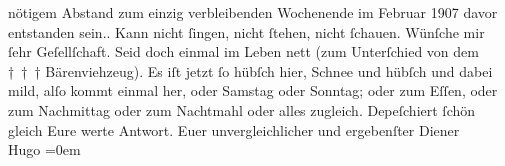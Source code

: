 \begin{ledgroupsized}[t]{13cm}
{{{                  nötigem Abstand zum einzig verbleibenden Wochenende im Februar 1907
                  davor entstanden sein.}}}\label{K_L01655_1h}. Kann nicht ſingen, nicht ſtehen, nicht ſchauen.
               Wünſche mir ſehr Geſellſchaft. Seid doch einmal im Leben nett (zum Unterſchied von
               dem † † † Bärenviehzeug). Es iſt jetzt ſo hübſch hier, Schnee und hübſch und dabei mild,
               alſo {\pb}kommt einmal her, oder Samstag oder Sonntag; oder zum Eſſen, oder
               zum Nachmittag oder zum Nachtmahl oder alles zugleich.\pend
           \pstart
           Depeſchiert ſchön gleich Eure werte Antwort.\pend
           \pstart
           Euer unvergleichlicher und ergebenſter Diener{\\[\baselineskip]}\spacefill\mbox{Hugo}\pend
           \leftskip=0em{}\endnumbering{}\end{ledgroupsized}  \newcommand{\dateiname}{L01655}\newcommand{\titel}{Hugo von Hofmannsthal an Arthur Schnitzler, [zwischen 3.–7. 2. 1907]}\newcommand{\editorInnen}{Martin Anton Müller und Gerd-Hermann Susen}
      